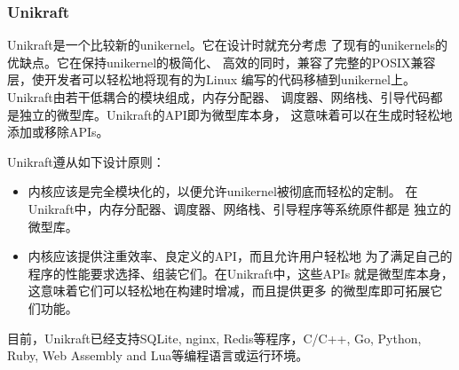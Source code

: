 \documentclass{../runikraft-report}
\begin{document}

\subsubsection{Unikraft}
Unikraft是一个比较新的unikernel。它在设计时就充分考虑
了现有的unikernels的优缺点。它在保持unikernel的极简化、
高效的同时，兼容了完整的POSIX兼容层，使开发者可以轻松地将现有的为Linux
编写的代码移植到unikernel上。Unikraft由若干低耦合的模块组成，内存分配器、
调度器、网络栈、引导代码都是独立的微型库。Unikraft的API即为微型库本身，
这意味着可以在生成时轻松地添加或移除APIs。\cite{bib:unikraft}

Unikraft遵从如下设计原则：
\begin{itemize}
\item 内核应该是完全模块化的，以便允许unikernel被彻底而轻松的定制。
在Unikraft中，内存分配器、调度器、网络栈、引导程序等系统原件都是
独立的微型库。
\item 内核应该提供注重效率、良定义的API，而且允许用户轻松地
为了满足自己的程序的性能要求选择、组装它们。在Unikraft中，这些APIs
就是微型库本身，这意味着它们可以轻松地在构建时增减，而且提供更多
的微型库即可拓展它们功能。
\end{itemize}

目前，Unikraft已经支持SQLite, nginx, Redis等程序，C/C++, Go, Python, Ruby,
Web Assembly and Lua等编程语言或运行环境。
\end{document}
